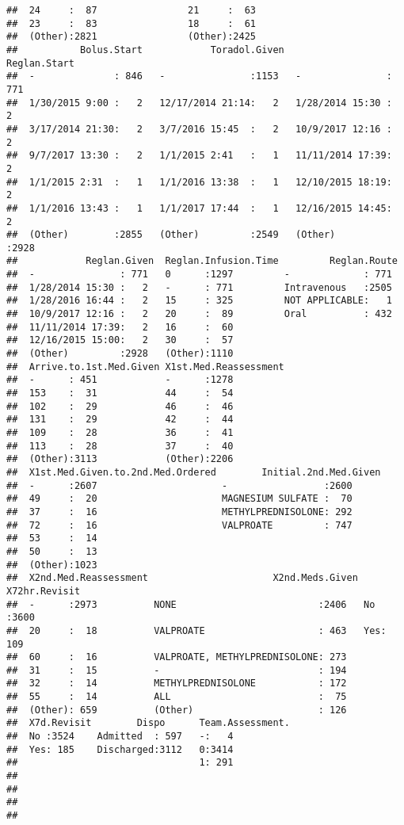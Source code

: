 \documentclass[]{article}
\begin{document}
\begin{verbatim}
##  24     :  87                21     :  63             
##  23     :  83                18     :  61             
##  (Other):2821                (Other):2425             
##           Bolus.Start            Toradol.Given            Reglan.Start 
##  -              : 846   -               :1153   -               : 771  
##  1/30/2015 9:00 :   2   12/17/2014 21:14:   2   1/28/2014 15:30 :   2  
##  3/17/2014 21:30:   2   3/7/2016 15:45  :   2   10/9/2017 12:16 :   2  
##  9/7/2017 13:30 :   2   1/1/2015 2:41   :   1   11/11/2014 17:39:   2  
##  1/1/2015 2:31  :   1   1/1/2016 13:38  :   1   12/10/2015 18:19:   2  
##  1/1/2016 13:43 :   1   1/1/2017 17:44  :   1   12/16/2015 14:45:   2  
##  (Other)        :2855   (Other)         :2549   (Other)         :2928  
##            Reglan.Given  Reglan.Infusion.Time         Reglan.Route 
##  -               : 771   0      :1297         -             : 771  
##  1/28/2014 15:30 :   2   -      : 771         Intravenous   :2505  
##  1/28/2016 16:44 :   2   15     : 325         NOT APPLICABLE:   1  
##  10/9/2017 12:16 :   2   20     :  89         Oral          : 432  
##  11/11/2014 17:39:   2   16     :  60                              
##  12/16/2015 15:00:   2   30     :  57                              
##  (Other)         :2928   (Other):1110                              
##  Arrive.to.1st.Med.Given X1st.Med.Reassessment
##  -      : 451            -      :1278         
##  153    :  31            44     :  54         
##  102    :  29            46     :  46         
##  131    :  29            42     :  44         
##  109    :  28            36     :  41         
##  113    :  28            37     :  40         
##  (Other):3113            (Other):2206         
##  X1st.Med.Given.to.2nd.Med.Ordered        Initial.2nd.Med.Given
##  -      :2607                      -                 :2600     
##  49     :  20                      MAGNESIUM SULFATE :  70     
##  37     :  16                      METHYLPREDNISOLONE: 292     
##  72     :  16                      VALPROATE         : 747     
##  53     :  14                                                  
##  50     :  13                                                  
##  (Other):1023                                                  
##  X2nd.Med.Reassessment                      X2nd.Meds.Given X72hr.Revisit
##  -      :2973          NONE                         :2406   No :3600     
##  20     :  18          VALPROATE                    : 463   Yes: 109     
##  60     :  16          VALPROATE, METHYLPREDNISOLONE: 273                
##  31     :  15          -                            : 194                
##  32     :  14          METHYLPREDNISOLONE           : 172                
##  55     :  14          ALL                          :  75                
##  (Other): 659          (Other)                      : 126                
##  X7d.Revisit        Dispo      Team.Assessment.
##  No :3524    Admitted  : 597   -:   4          
##  Yes: 185    Discharged:3112   0:3414          
##                                1: 291          
##                                                
##                                                
##                                                
## 
\end{verbatim}
\end{document}
